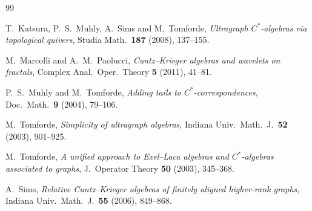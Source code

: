 \documentclass[12pt, reqno]{amsart}
\theoremstyle{definition}
\theoremstyle{remark}
\numberwithin{equation}{section}
\begin{document}
\begin{thebibliography}{99}

T.\ Katsura, P.\ S.\ Muhly, A.\ Sims and M.\ Tomforde,
\textit{Ultragraph $C^*$-algebras via topological quivers},
Studia Math.\ \textbf{187} (2008), 137--155.

M.\ Marcolli and A.\ M.\ Paolucci,
\textit{Cuntz--Krieger algebras and wavelets on fractals},
Complex Anal.\ Oper.\ Theory \textbf{5} (2011), 41--81.


P.\ S.\ Muhly and M.\ Tomforde,
\textit{Adding tails to $C^*$-correspondences},
Doc.\ Math.\ \textbf{9} (2004), 79--106.

M.\ Tomforde,
\textit{Simplicity of ultragraph algebras},
Indiana Univ.\ Math.\ J.\ \textbf{52} (2003), 901--925.



M.\ Tomforde,
\textit{A unified approach to Exel--Laca algebras and $C^*$-algebras associated to graphs},
J.\ Operator Theory \textbf{50} (2003), 345--368.

A.\ Sims,
\textit{Relative Cuntz--Krieger algebras of finitely aligned higher-rank graphs},
Indiana Univ.\ Math.\ J.\ \textbf{55} (2006), 849--868.



\end{thebibliography}
\end{document}
